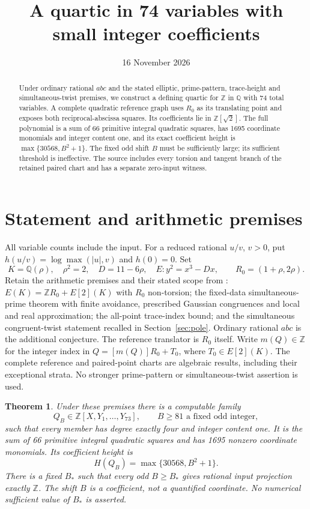 \documentclass[11pt,a4paper]{article}
\title{A quartic in 74 variables with small integer coefficients}
\author{}\date{16 November 2026}
\newtheorem{theorem}{Theorem}[section]
\newcommand{\Q}{\mathbb Q}\newcommand{\Z}{\mathbb Z}
\begin{document}
\maketitle
\begin{abstract}
Under ordinary rational $abc$ and the stated elliptic, prime-pattern,
trace-height and simultaneous-twist premises, we construct a defining
quartic for $\Z$ in $\Q$ with 74 total variables. A complete quadratic
reference graph uses $R_0$ as its translating point and
exposes both reciprocal-abscissa squares. Its coefficients lie in
$\Z[\sqrt2]$. The full polynomial is a sum of 66 primitive integral
quadratic squares, has 1695 coordinate monomials and integer content one,
and its exact coefficient height is $\max\{30568,B^2+1\}$. The fixed
odd shift $B$ must be sufficiently large; its sufficient threshold is
ineffective. The source includes every torsion and tangent branch of
the retained paired chart and has a separate zero-input witness.
\end{abstract}

\section{Statement and arithmetic premises}
All variable counts include the input. For a reduced rational $u/v$,
$v>0$, put $h(u/v)=\log\max(|u|,v)$ and $h(0)=0$.
Set
\[
 K=\Q(\rho),\quad\rho^2=2,\quad D=11-6\rho,\quad
 E:y^2=x^3-Dx,\qquad R_0=(1+\rho,2\rho).
\]
Retain the arithmetic premises and their stated scope from
\cite{Parent}: $E(K)=\Z R_0+E[2](K)$ with $R_0$ non-torsion;
the fixed-data simultaneous-prime theorem with finite avoidance,
prescribed Gaussian congruences and local and real approximation;
the all-point trace-index bound; and the simultaneous congruent-twist
statement recalled in Section~\ref{sec:pole}. Ordinary rational $abc$
is the additional conjecture. The reference translator is $R_0$ itself. Write $m(Q)\in\Z$ for the
integer index in $Q=[m(Q)]R_0+T_0$, where $T_0\in E[2](K)$.
The complete reference and paired-point charts are algebraic results,
including their exceptional strata.
No stronger prime-pattern or simultaneous-twist assertion is used.

\begin{theorem}\label{thm:main}
Under these premises there is a computable family
\[
 Q_B\in\Z[X,Y_1,\ldots,Y_{73}],\qquad
 B\ge81\text{ a fixed odd integer},
\]
such that every member has degree exactly four and integer content one.
It is the sum of 66 primitive integral quadratic squares and has
1695 nonzero coordinate monomials. Its coefficient height is
\[
 H(Q_B)=\max\{30568,B^2+1\}.
\]
There is a fixed $B_*$ such that every odd $B\ge B_*$ gives rational
input projection exactly $\Z$. The shift $B$ is a coefficient, not a
quantified coordinate. No numerical sufficient value of $B_*$ is asserted.
\end{theorem}
\end{document}
